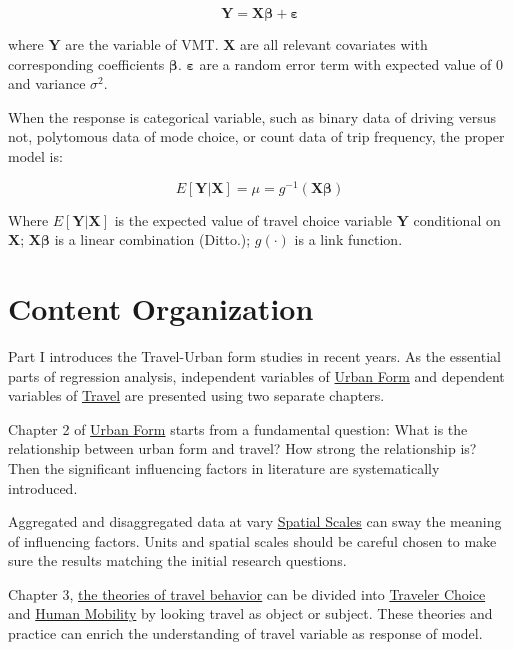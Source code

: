 \documentclass[
  11pt,
  openany]{memoir}
\begin{document}
\begin{equation}
\mathbf{Y}=\mathbf{X}\boldsymbol{\beta}+\boldsymbol{\varepsilon}
\label{eq:lm}
\end{equation}

where \(\mathbf{Y}\) are the variable of VMT. \(\mathbf{X}\) are all relevant covariates with corresponding coefficients \(\boldsymbol{\beta}\). \(\boldsymbol{\varepsilon}\) are a random error term with expected value of \(0\) and variance \(\sigma^2\).

When the response is categorical variable, such as binary data of driving versus not, polytomous data of mode choice, or count data of trip frequency, the proper model is:

\begin{equation}
E[\mathbf{Y}|\mathbf{X}]=\mu=g^{-1}(\mathbf{X}\boldsymbol{\beta})
\label{eq:glm}
\end{equation}

Where \(E[\mathbf{Y}|\mathbf{X}]\) is the expected value of travel choice variable \(\mathbf{Y}\) conditional on \(\mathbf{X}\); \(\mathbf{X}\boldsymbol{\beta}\) is a linear combination (Ditto.); \(g(\cdot)\) is a link function.

\hypertarget{content-organization}{%
\section{Content Organization}\label{content-organization}}

Part I introduces the Travel-Urban form studies in recent years.
As the essential parts of regression analysis, independent variables of \protect\hyperlink{form}{Urban Form} and dependent variables of \protect\hyperlink{travel}{Travel} are presented using two separate chapters.

Chapter 2 of \protect\hyperlink{form}{Urban Form} starts from a fundamental question: What is the relationship between urban form and travel? How strong the relationship is?
Then the significant influencing factors in literature are systematically introduced.

Aggregated and disaggregated data at vary \protect\hyperlink{scale}{Spatial Scales} can sway the meaning of influencing factors. Units and spatial scales should be careful chosen to make sure the results matching the initial research questions.

Chapter 3, \protect\hyperlink{travel}{the theories of travel behavior} can be divided into \protect\hyperlink{traveler-choice}{Traveler Choice} and \protect\hyperlink{human-mobility}{Human Mobility} by looking travel as object or subject.
These theories and practice can enrich the understanding of travel variable as response of model.
\end{document}
